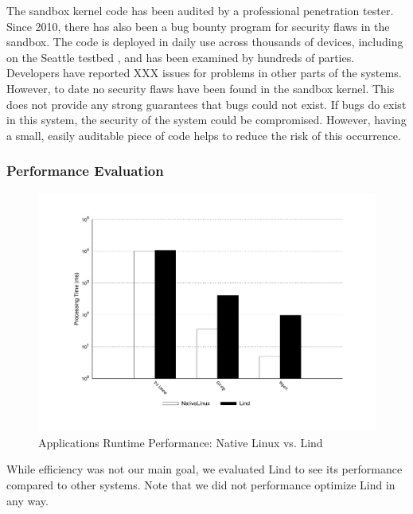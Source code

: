 The sandbox kernel code has been
audited by a professional penetration tester.  Since 2010, there has also been
a bug bounty program for security flaws in the sandbox.
The code is deployed in daily use across thousands of devices,
including on the Seattle testbed \cite{seattle}, and has been examined by
hundreds of parties.  Developers have reported
XXX issues for problems in other parts of the systems. However, to date
no security flaws have been found in the sandbox kernel.
This does not provide any strong guarantees that bugs could not exist.  If bugs do
exist in this system, the security of the system could be compromised.
However, having a small, easily auditable piece of code helps to reduce the
risk of this occurrence.

\subsubsection{Performance Evaluation}
\label{Performance-Evaluation}

\begin{figure}
\centering
\includegraphics[width=1.0\columnwidth]{diagram/lind_oakland16_performance.pdf}
\caption{Applications Runtime Performance: Native Linux vs. Lind}
\label{fig:performance_applications}
\end{figure}

While efficiency was not our main goal, we evaluated Lind to see
its performance compared to other systems.  Note that we did not performance
optimize Lind in any way.

